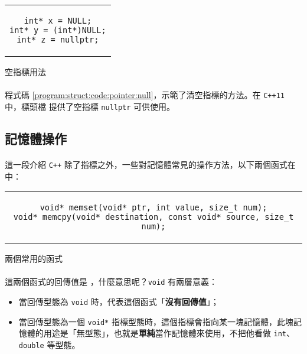 \documentclass[12pt,a4paper,oneside]{report}
\begin{document}
\begin{CJK}{UTF8}{bkai}
\begin{code}[h!]
\begin{tabular}{c}
\begin{lstlisting}
int* x = NULL;
int* y = (int*)NULL;
int* z = nullptr;
\end{lstlisting}
\end{tabular}
\caption{空指標用法}
\label{program:struct:code:pointer:null}
\end{code}

\paragraph{}程式碼 \ref{program:struct:code:pointer:null}，示範了清空指標的方法。在 \texttt{C++11} 中，標頭檔  提供了空指標 \lstinline!nullptr! 可供使用。

\subsection{記憶體操作}

\paragraph{}這一段介紹 \texttt{C++} 除了指標之外，一些對記憶體常見的操作方法，以下兩個函式在  中：

\begin{code}[h!]
\centering
\begin{tabular}{c}
\begin{lstlisting}
void* memset(void* ptr, int value, size_t num);
void* memcpy(void* destination, const void* source, size_t num);
\end{lstlisting}
\end{tabular}
\caption{兩個常用的函式}
\label{program:struct:code:memory:function}
\end{code}

\paragraph{}這兩個函式的回傳值是 ，什麼意思呢？\lstinline!void! 有兩層意義：

\begin{itemize}
\item 當回傳型態為 \lstinline!void! 時，代表這個函式「{\color{red}\textbf{沒有回傳值}}」；
\item 當回傳型態為一個 \lstinline!void*! 指標型態時，這個指標會指向某一塊記憶體，此塊記憶體的用途是「無型態」，也就是\textbf{單純}當作記憶體來使用，不把他看做 \lstinline!int!、\lstinline!double! 等型態。
\end{itemize}


\end{CJK}
\end{document}
